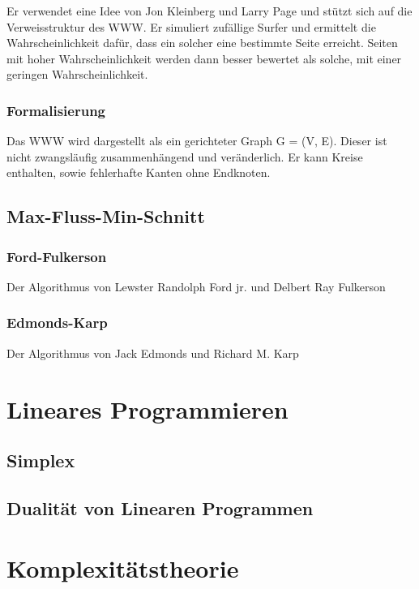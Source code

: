 Er verwendet eine Idee von Jon Kleinberg und
Larry Page und stützt sich auf die Verweisstruktur des WWW.
Er simuliert zufällige Surfer und ermittelt die Wahrscheinlichkeit dafür, dass ein solcher eine bestimmte Seite erreicht. Seiten
mit hoher Wahrscheinlichkeit werden dann besser bewertet als solche, mit einer
geringen Wahrscheinlichkeit.

\subsubsection{Formalisierung}

Das WWW wird dargestellt als ein gerichteter Graph G = (V, E).
Dieser ist nicht zwangsläufig zusammenhängend und veränderlich. Er kann Kreise
enthalten, sowie fehlerhafte Kanten ohne Endknoten.

\subsection{Max-Fluss-Min-Schnitt}

\subsubsection{Ford-Fulkerson}
Der Algorithmus von Lewster Randolph Ford jr. und Delbert Ray Fulkerson

\subsubsection{Edmonds-Karp}
Der Algorithmus von Jack Edmonds und Richard
M. Karp


\section{Lineares Programmieren}

\subsection{Simplex}
\subsection{Dualität von Linearen Programmen}


\section{Komplexitätstheorie}

